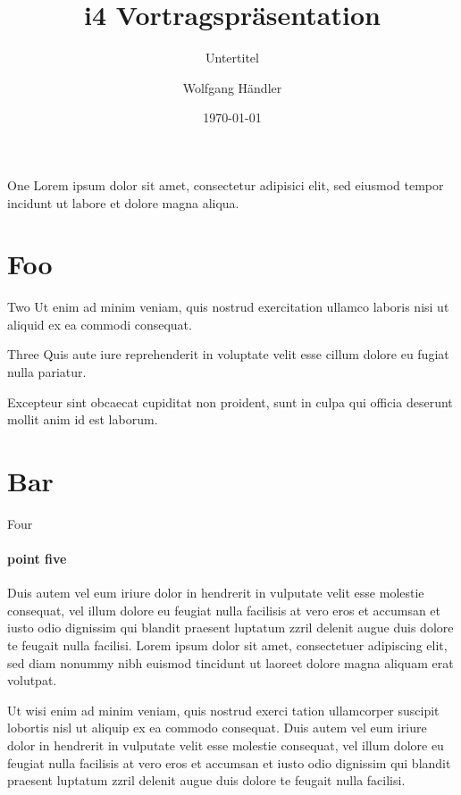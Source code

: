 \documentclass[aspectratio=1610,12pt]{beamer}
\title[i4talk]{i4 Vortragspräsentation}
\subtitle{Untertitel}
\date{\today}
\author{Wolfgang Händler}
\institute{Friedrich-Alexander-Universität Erlangen-Nürnberg}
\begin{document}
\maketitle[extern]

\begin{frame}{One}
	Lorem ipsum dolor sit amet, consectetur adipisici elit, sed eiusmod tempor incidunt ut labore et dolore magna aliqua. 
\end{frame}


\section{Foo}

\begin{frame}{Two}
	Ut enim ad minim veniam, quis nostrud exercitation ullamco laboris nisi ut aliquid ex ea commodi consequat.
\end{frame}

\begin{frame}{Three}
	Quis aute iure reprehenderit in voluptate velit esse cillum dolore eu fugiat nulla pariatur. 
	\begin{block}{Excepteur}
		sint obcaecat cupiditat non proident, sunt in culpa qui officia deserunt mollit anim id est laborum.
	\end{block}
\end{frame}


\section{Bar}

\begin{frame}{Four}
	\framesubtitle{point five}
	\small
	Duis autem vel eum iriure dolor in hendrerit in vulputate velit esse molestie consequat, vel illum dolore eu feugiat nulla facilisis at vero eros et accumsan et iusto odio dignissim qui blandit praesent luptatum zzril delenit augue duis dolore te feugait nulla facilisi. Lorem ipsum dolor sit amet, consectetuer adipiscing elit, sed diam nonummy nibh euismod tincidunt ut laoreet dolore magna aliquam erat volutpat.

	Ut wisi enim ad minim veniam, quis nostrud exerci tation ullamcorper suscipit lobortis nisl ut aliquip ex ea commodo consequat. Duis autem vel eum iriure dolor in hendrerit in vulputate velit esse molestie consequat, vel illum dolore eu feugiat nulla facilisis at vero eros et accumsan et iusto odio dignissim qui blandit praesent luptatum zzril delenit augue duis dolore te feugait nulla facilisi.
\end{frame}
\end{document}
